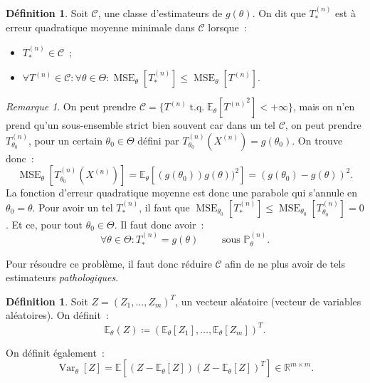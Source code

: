 \documentclass{report}
\DeclareMathOperator{\tq}{\text{ t.q. }}
\DeclareMathOperator{\Var}{Var}
\DeclareMathOperator{\MSE}{MSE}
\renewcommand{\P}{\mathbb P}
\newcommand{\E}{\mathbb E}
\newcommand{\pinfty}{{+\infty}}
\newcommand{\R}{\mathbb R}
\newcommand{\n}{{(n)}}
\newcommand{\Xn}{{X^\n}}
\newcommand{\Tn}{{T^\n}}
\theoremstyle{definition}
\newtheorem{déf}[thm]{Définition}
\theoremstyle{remark}
\newtheorem*{rmq}{Remarque}
\begin{document}
			\begin{déf} Soit $\mathcal C$, une classe d'estimateurs de $g(\theta)$. On dit que $T_*^{(n)}$ est à erreur quadratique moyenne minimale dans $\mathcal C$
			lorsque~:
			\begin{itemize}
				\item $T_*^{(n)} \in \mathcal C$~;
				\item $\forall \Tn \in \mathcal C : \forall \theta \in \Theta : \MSE_\theta[T_*^{(n)}] \leq \MSE_\theta[\Tn]$.
			\end{itemize}
			\end{déf}

			\begin{rmq} On peut prendre $\mathcal C = \{\Tn \tq \E_\theta[\Tn^2] < \pinfty\}$, mais on n'en prend qu'un sous-ensemble strict bien souvent car dans un tel
			$\mathcal C$, on peut prendre $T_{\theta_0}^{(n)}$, pour un certain $\theta_0 \in \Theta$ défini par $T_{\theta_0}^{(n)}(\Xn) = g(\theta_0)$.
			On trouve donc~:
			\[\MSE_\theta[T_{\theta_0}^{(n)}(\Xn)] = \E_\theta[(g(\theta_0) ) g(\theta))^2] = (g(\theta_0) - g(\theta))^2.\]
			La fonction d'erreur quadratique moyenne est donc une parabole qui s'annule en $\theta_0 = \theta$. Pour avoir un tel $T_*^{(n)}$, il faut que
			$\MSE_{\theta_0}[T_*^{(n)}] \leq \MSE_{\theta_0}[T_{\theta_0}^{(n)}] = 0$. Et ce, pour tout $\theta_0 \in \Theta$. Il faut donc avoir~:
			\[\forall \theta \in \Theta : T_*^{(n)} = g(\theta)\qquad\text{ sous }\P_\theta^{(n)}.\]

			Pour résoudre ce problème, il faut donc réduire $\mathcal C$ afin de ne plus avoir de tels estimateurs \textit{pathologiques}.
			\end{rmq}

			\begin{déf} Soit $Z = (Z_1, \ldots, Z_m)^T$, un vecteur aléatoire (vecteur de variables aléatoires). On définit~:
			\[\E_\theta(Z) \coloneqq (\E_\theta[Z_1], \ldots, \E_\theta[Z_m])^T.\]

			On définit également~:
			\[\Var_\theta[Z] = \E\left[(Z - \E_\theta[Z])(Z - \E_\theta[Z])^T\right] \in \R^{m \times m}.\]
			\end{déf}
\end{document}
